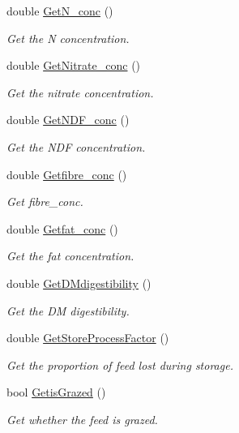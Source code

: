 \begin{DoxyCompactItemize}
double \mbox{\hyperlink{classfeed_item_ab292a740b8d19616f849e2aaa33f4884}{Get\+N\+\_\+conc}} ()
\begin{DoxyCompactList}\small\item\em Get the N concentration. \end{DoxyCompactList}\item 
double \mbox{\hyperlink{classfeed_item_a085b65e8acfd2244163a28feb7374491}{Get\+Nitrate\+\_\+conc}} ()
\begin{DoxyCompactList}\small\item\em Get the nitrate concentration. \end{DoxyCompactList}\item 
double \mbox{\hyperlink{classfeed_item_a389c3dfb020e459f46d0b0050898fa5d}{Get\+N\+D\+F\+\_\+conc}} ()
\begin{DoxyCompactList}\small\item\em Get the N\+DF concentration. \end{DoxyCompactList}\item 
double \mbox{\hyperlink{classfeed_item_a9d415fcfd784a6432d84401c45e62284}{Getfibre\+\_\+conc}} ()
\begin{DoxyCompactList}\small\item\em Get fibre\+\_\+conc. \end{DoxyCompactList}\item 
double \mbox{\hyperlink{classfeed_item_a691bb377b814d94f806918e8572ad59f}{Getfat\+\_\+conc}} ()
\begin{DoxyCompactList}\small\item\em Get the fat concentration. \end{DoxyCompactList}\item 
double \mbox{\hyperlink{classfeed_item_a1d4a479d20f0a6796825b6a9369b04d7}{Get\+D\+Mdigestibility}} ()
\begin{DoxyCompactList}\small\item\em Get the DM digestibility. \end{DoxyCompactList}\item 
double \mbox{\hyperlink{classfeed_item_a86efcd61f525edf159c12193e1cf4f91}{Get\+Store\+Process\+Factor}} ()
\begin{DoxyCompactList}\small\item\em Get the proportion of feed lost during storage. \end{DoxyCompactList}\item 
bool \mbox{\hyperlink{classfeed_item_a6e07dda15c41ded136ba5f52ccb263a6}{Getis\+Grazed}} ()
\begin{DoxyCompactList}\small\item\em Get whether the feed is grazed. \end{DoxyCompactList}\item 

\end{DoxyCompactItemize}
